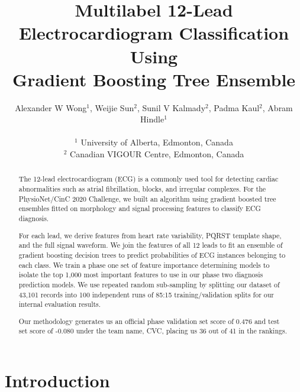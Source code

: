 \documentclass[twocolumn]{cinc}
\begin{document}


\title{Multilabel 12-Lead Electrocardiogram Classification Using \\
Gradient Boosting Tree Ensemble}

\author {Alexander W Wong$^{1}$, Weijie Sun$^{2}$, Sunil V Kalmady$^{2}$, Padma Kaul$^{2}$, Abram Hindle$^{1}$\\
\ \\
 $^1$ University of Alberta, Edmonton, Canada \\
$^2$ Canadian VIGOUR Centre, Edmonton, Canada }

\maketitle

\newcommand{\officialvalscore}{{0.476} }
\newcommand{\officialtestscore}{{-0.080} }

\begin{abstract}

The 12-lead electrocardiogram (ECG) is a commonly used tool for detecting cardiac abnormalities such as atrial fibrillation, blocks, and irregular complexes.
For the PhysioNet/CinC 2020 Challenge, we built an algorithm using gradient boosted tree ensembles fitted on morphology and signal processing features to classify ECG diagnosis.

For each lead, we derive features from heart rate variability, PQRST template shape, and the full signal waveform.
We join the features of all 12 leads to fit an ensemble of gradient boosting decision trees to predict probabilities of ECG instances belonging to each class.
We train a phase one set of feature importance determining models to isolate the top 1,000 most important features to use in our phase two diagnosis prediction models.
We use repeated random sub-sampling by splitting our dataset of 43,101 records into 100 independent runs of 85:15 training/validation splits for our internal evaluation results.

Our methodology generates us an official phase validation set score of \officialvalscore and test set score of \officialtestscore under the team name, CVC, placing us 36 out of 41 in the rankings.

\end{abstract}

\section{Introduction}
\end{document}
